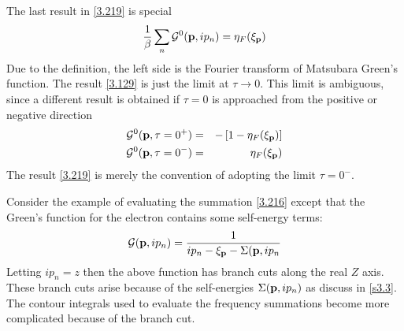 The last result in \eqref{3.219} is special
\begin{equation}
    \frac{1}{\beta} \sum_n \mathcal{G}^0 (\mathbf{p},ip_n) = \eta_F(\xi_{\mathbf{p}}) \nonumber
\end{equation}
Due to the definition, the left side is the Fourier transform of Matsubara Green's function.
The result \eqref{3.129} is just the limit at $\tau \to 0$.
This limit is ambiguous, since a different result is obtained if $\tau=0$ is approached from the positive or negative direction
\begin{eqnarray}
    \mathcal{G}^0(\mathbf{p},\tau= 0^+) &=& - \left[1-\eta_F(\xi_{\mathbf{p}})\right] \label{3.238}\\
    \mathcal{G}^0(\mathbf{p},\tau= 0^-) &=& \eta_F(\xi_{\mathbf{p}})    \label{3.239}
\end{eqnarray}
The result \eqref{3.219} is merely the convention of adopting the limit $\tau = 0^-$.

Consider the example of evaluating the summation \eqref{3.216} except that the Green's function for the electron contains some self-energy terms:
\begin{equation}
    \mathcal{G}(\mathbf{p},ip_n) = \frac{1}{ip_n -\xi_{\mathbf{p}} -\Sigma(\mathbf{p},ip_n} \label{3.241}
\end{equation}
Letting $ip_n =z$ then the above function has branch cuts along the real $Z$ axis.
These branch cuts arise because of the self-energies $\Sigma(\mathbf{p},ip_n)$ as discuss in \ref{s3.3}.
The contour integrals used to evaluate the frequency summations become more complicated because of the branch cut.

